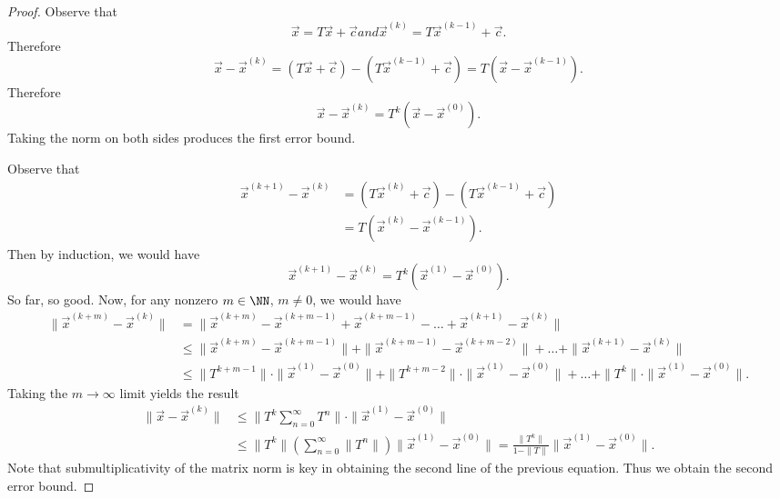 \begin{proof}
Observe that
\begin{subequations}
\begin{equation}
\vec{x}=T\vec{x}+\vec{c}
\end{equation}
and
\begin{equation}
\vec{x}^{(k)}=T\vec{x}^{(k-1)}+\vec{c}.
\end{equation}
\end{subequations}
Therefore
\begin{equation}
\vec{x}-\vec{x}^{(k)}=(T\vec{x}+\vec{c})-(T\vec{x}^{(k-1)}+\vec{c})=T(\vec{x}-\vec{x}^{(k-1)}).
\end{equation}
Therefore
\begin{equation}
\vec{x}-\vec{x}^{(k)}=T^{k}(\vec{x}-\vec{x}^{(0)}).
\end{equation}
Taking the norm on both sides produces the first error bound.

Observe that
\begin{equation}
\begin{split}
\vec{x}^{(k+1)}-\vec{x}^{(k)}
&=(T\vec{x}^{(k)}+\vec{c})-(T\vec{x}^{(k-1)}+\vec{c})\\
&=T(\vec{x}^{(k)}-\vec{x}^{(k-1)}).
\end{split}
\end{equation}
Then by induction, we would have
\begin{equation}
\vec{x}^{(k+1)}-\vec{x}^{(k)}=T^{k}(\vec{x}^{(1)}-\vec{x}^{(0)}).
\end{equation}
So far, so good. Now, for any nonzero $m\in\NN$, $m\neq0$, we would have
\begin{align*}
\|\vec{x}^{(k+m)}-\vec{x}^{(k)}\|&=
\|\vec{x}^{(k+m)}-\vec{x}^{(k+m-1)}+\vec{x}^{(k+m-1)}-\dots+\vec{x}^{(k+1)}-\vec{x}^{(k)}\|\\
&\leq\|\vec{x}^{(k+m)}-\vec{x}^{(k+m-1)}\|+\|\vec{x}^{(k+m-1)}-\vec{x}^{(k+m-2)}\|+\dots+\|\vec{x}^{(k+1)}-\vec{x}^{(k)}\|\\
&\leq \|T^{k+m-1}\|\cdot\|\vec{x}^{(1)}-\vec{x}^{(0)}\|+\|T^{k+m-2}\|\cdot\|\vec{x}^{(1)}-\vec{x}^{(0)}\|+\dots+\|T^{k}\|\cdot\|\vec{x}^{(1)}-\vec{x}^{(0)}\|.
\end{align*}
Taking the $m\to\infty$ limit yields the result
\begin{equation}
  \begin{split}
\|\vec{x}-\vec{x}^{(k)}\|&\leq\|T^{k}\sum^{\infty}_{n=0}T^{n}\|\cdot\|\vec{x}^{(1)}-\vec{x}^{(0)}\|\\
&\leq\|T^{k}\|\left(\sum^{\infty}_{n=0}\|T^{n}\|\right)\|\vec{x}^{(1)}-\vec{x}^{(0)}\|=\frac{\|T^{k}\|}{1-\|T\|}\|\vec{x}^{(1)}-\vec{x}^{(0)}\|.
  \end{split}
\end{equation}
Note that submultiplicativity of the matrix norm is key in obtaining the
second line of the previous equation. Thus we obtain the second error bound.
\end{proof}


